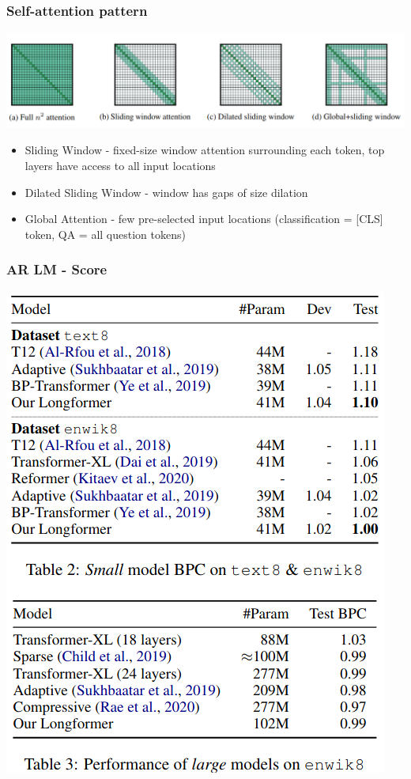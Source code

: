\documentclass{beamer}
\begin{document}
\begin{frame}
    \frametitle{Self-attention pattern}
    \begin{center}
        \includegraphics[scale=0.28]{img/longformer_attention.png}
    \end{center}
    \begin{itemize}
        \item Sliding Window - fixed-size window attention surrounding each token, top layers have access to all input locations
        \item Dilated Sliding Window - window has gaps of size dilation
        \item Global Attention - few pre-selected input locations (classification = [CLS] token, QA = all question tokens)
    \end{itemize}
\end{frame}

\begin{frame}
    \frametitle{AR LM - Score}
    \begin{center}
        \includegraphics[scale=0.30]{img/longformer_transformer_score.png}
    \end{center}
\end{frame}
\end{document}
